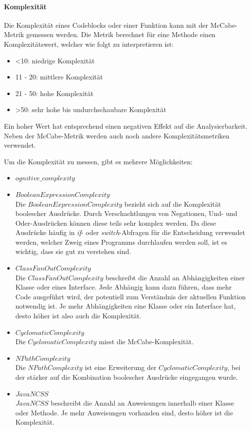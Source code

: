 \documentclass[
	oneside,  %
	ngerman, 
	final, 
	11pt, 
	a4paper, 
	1.1headlines, 
	headinclude=false, 
	footinclude=false, 
	mpinclude=false, 
	pagesize, 
	onecolumn, 
	titlepage, 
	parskip=half, 
	headsepline, 
	chapterprefix=false, 
	version=first, 
	listof=totoc, 
	bibliography=totoc, 
	toc=graduated, 
	fleqn
]{scrbook}
\begin{document}
\paragraph{Komplexität}
Die Komplexität eines Codeblocks oder einer Funktion kann mit der McCabe-Metrik gemessen werden.
Die Metrik berechnet für eine Methode einen Komplexitätswert, welcher wie folgt zu interpretieren ist:

\begin{itemize}
	\item <10: niedrige Komplexität
	\item 11 - 20: mittlere Komplexität
	\item 21 - 50: hohe Komplexität
	\item >50: sehr hohe bis undurchschaubare Komplexität
\end{itemize}

Ein hoher Wert hat entsprechend einen negativen Effekt auf die Analysierbarkeit.
Neben der McCabe-Metrik werden auch noch andere Komplexitätsmetriken verwendet.

Um die Komplexität zu messen, gibt es mehrere Möglichkeiten:

\begin{itemize}
	\item $ognitive\_complexity$
	\item $BooleanExpressionComplexity$\\
	Die $BooleanExpressionComplexity$ bezieht sich auf die Komplexität boolescher Ausdrücke.
	Durch Verschachtlungen von Negationen, Und- und Oder-Ausdrücken können diese teils sehr komplex werden.
	Da diese Ausdrücke häufig in \textit{if}- oder \textit{switch}-Abfragen für die Entscheidung verwendet werden, welcher Zweig eines Programms durchlaufen werden soll, ist es wichtig, dass sie gut zu verstehen sind.
	\item $ClassFanOutComplexity$\\
	Die $ClassFanOutComplexity$ beschreibt die Anzahl an Abhängigkeiten einer Klasse oder eines Interface.
	Jede Abhängig kann dazu führen, dass mehr Code ausgeführt wird, der potentiell zum Verständnis der aktuellen Funktion notwendig ist.
	Je mehr Abhängigkeiten eine Klasse oder ein Interface hat, desto höher ist also auch die Komplexität.
	\item $CyclomaticComplexity$\\
	Die $CyclomaticComplexity$ misst die McCabe-Komplexität.
	\item $NPathComplexity$\\
	Die $NPathComplexity$ ist eine Erweiterung der $CyclomaticComplexity$, bei der stärker auf die Kombination boolescher Ausdrücke eingegangen wurde.
	\item $JavaNCSS$\\
	$JavaNCSS$ beschreibt die Anzahl an Anweisungen innerhalb einer Klasse oder Methode.
	Je mehr Anweisungen vorhanden sind, desto höher ist die Komplexität.
\end{itemize}
\end{document}
